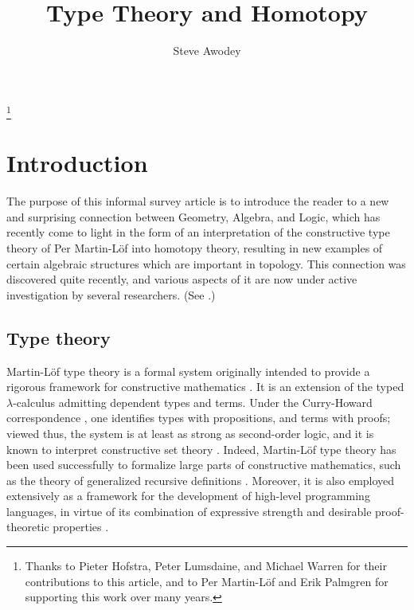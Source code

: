 \documentclass[reqno,12pt]{amsart}
\theoremstyle{definition}
\theoremstyle{remark}
\begin{document}

\title{Type Theory and Homotopy}
\author{Steve Awodey}
\date{} 
\thanks{
Thanks to Pieter Hofstra, Peter Lumsdaine, and Michael Warren for their contributions to this article, and to Per Martin-L\"of and Erik Palmgren for supporting this work over many years.}



\maketitle

\section{Introduction}

\noindent The purpose of this informal survey article is to introduce the reader to a new and surprising connection between Geometry, Algebra, and Logic, which has recently come to light in the form of an interpretation of the constructive type theory of Per Martin-L\"of into homotopy theory, resulting in new examples of certain algebraic structures which are important in topology.  This connection was discovered quite recently, and various aspects of it are now under active investigation by several researchers.
 (See \cite{Awodey:HMIT,AHW:MLC,Warren:PhD, Berg:TWOG,Gambino:ITWFS,Garner:TDMTT,benno-richard,Lumsdaine:WOITT,vdBG:TSMIT,VVnote}.)%

\subsection{Type theory}

Martin-L\"of type theory is a formal system originally intended to provide a rigorous framework for constructive mathematics \cite{MartinLof:ITT,MartinLof:ITT72,MartinLof:ITT84}.  It is an extension of the typed $\lambda$-calculus admitting dependent types and terms. Under the Curry-Howard correspondence \cite{Howard:FTNC}, one identifies types with propositions, and terms with proofs;
viewed thus, the system is at least as strong as second-order logic, and it is known to interpret constructive set theory \cite{Aczel:stengthML}.
  Indeed, Martin-L\"of type theory has been used successfully to formalize large parts of constructive mathematics, such as the theory of generalized recursive definitions \cite{Nordstrom:PMLTT,MartinLof:CMCP}.
 Moreover, it is also employed extensively as a framework for the development of high-level programming languages,  
in virtue of its combination of expressive strength and desirable proof-theoretic properties \cite{Nordstrom:PMLTT,Streicher:STT}.
\end{document}
